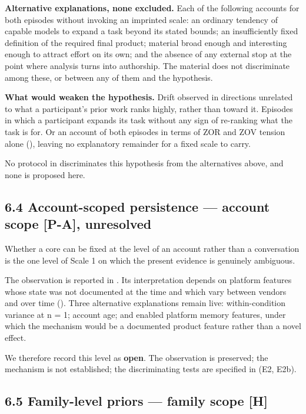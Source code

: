\textbf{Alternative explanations, none excluded.} Each of the following accounts for both episodes without invoking an imprinted scale: an ordinary tendency of capable models to expand a task beyond its stated bounds; an insufficiently fixed definition of the required final product; material broad enough and interesting enough to attract effort on its own; and the absence of any external stop at the point where analysis turns into authorship. The material does not discriminate among these, or between any of them and the hypothesis.

\textbf{What would weaken the hypothesis.} Drift observed in directions unrelated to what a participant's prior work ranks highly, rather than toward it. Episodes in which a participant expands its task without any sign of re-ranking what the task is for. Or an account of both episodes in terms of ZOR and ZOV tension alone (), leaving no explanatory remainder for a fixed scale to carry.

No protocol in  discriminates this hypothesis from the alternatives above, and none is proposed here.


\subsection*{6.4 Account-scoped persistence — account scope \textbf{[P-A]}, unresolved}
\label{sec:en:6.4}

Whether a core can be fixed at the level of an account rather than a conversation is the one level of Scale 1 on which the present evidence is genuinely ambiguous.

The observation is reported in . Its interpretation depends on platform features whose state was not documented at the time and which vary between vendors and over time (). Three alternative explanations remain live: within-condition variance at n = 1; account age; and enabled platform memory features, under which the mechanism would be a documented product feature rather than a novel effect.

We therefore record this level as \textbf{open}. The observation is preserved; the mechanism is not established; the discriminating tests are specified in  (E2, E2b).


\subsection*{6.5 Family-level priors — family scope \textbf{[H]}}
\label{sec:en:6.5}

